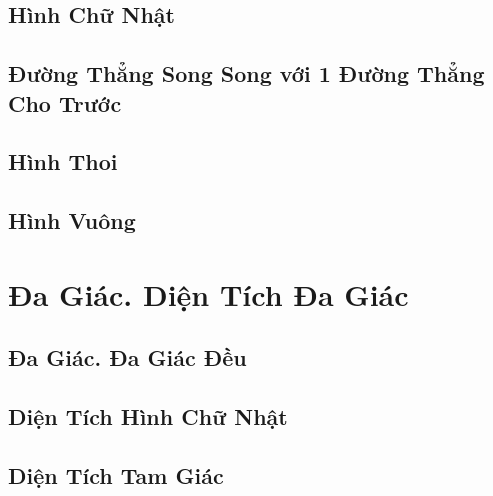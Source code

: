 \documentclass{article}
\numberwithin{equation}{section}
\begin{document}

\subsection{Hình Chữ Nhật}


\subsection{Đường Thẳng Song Song với 1 Đường Thẳng Cho Trước}


\subsection{Hình Thoi}


\subsection{Hình Vuông}


\section{Đa Giác. Diện Tích Đa Giác}

\subsection{Đa Giác. Đa Giác Đều}


\subsection{Diện Tích Hình Chữ Nhật}


\subsection{Diện Tích Tam Giác}
\end{document}

